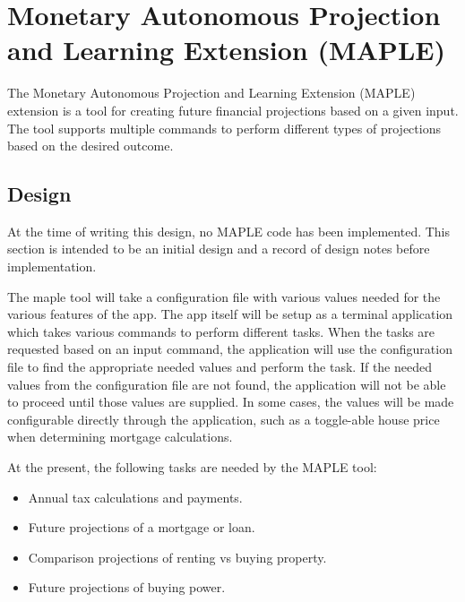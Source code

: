 \chapter{Monetary Autonomous Projection and Learning Extension (MAPLE)}
\pagestyle{fancy}

The Monetary Autonomous Projection and Learning Extension (MAPLE) extension is a tool for creating future financial projections based on a given input. The tool supports multiple commands to perform different types of projections based on the desired outcome.




\section{Design}

At the time of writing this design, no MAPLE code has been implemented. This section is intended to be an initial design and a record of design notes before implementation.

The maple tool will take a configuration file with various values needed for the various features of the app. The app itself will be setup as a terminal application which takes various commands to perform different tasks. When the tasks are requested based on an input command, the application will use the configuration file to find the appropriate needed values and perform the task. If the needed values from the configuration file are not found, the application will not be able to proceed until those values are supplied. In some cases, the values will be made configurable directly through the application, such as a toggle-able house price when determining mortgage calculations.

At the present, the following tasks are needed by the MAPLE tool:
\begin{itemize}
	\item Annual tax calculations and payments.
	\item Future projections of a mortgage or loan.
	\item Comparison projections of renting vs buying property.
	\item Future projections of buying power.
\end{itemize}